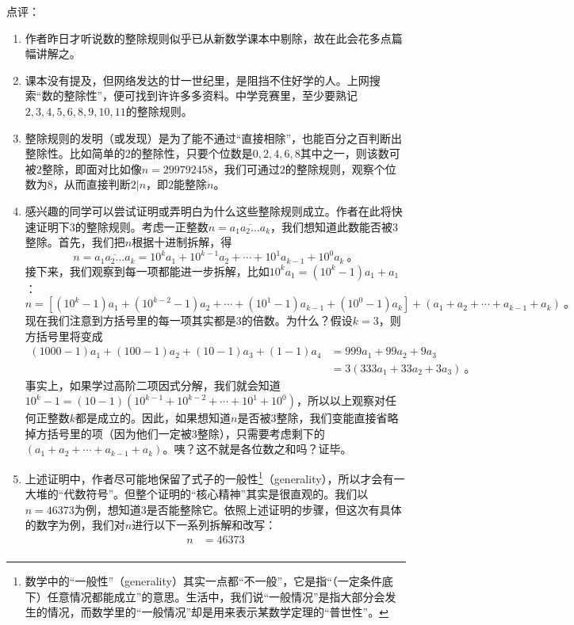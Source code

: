 \documentclass[a4,12pt]{article}
\begin{document}
	\noindent 点评：
	\begin{enumerate}[label=(\alph*)]
		\item 作者昨日才听说数的整除规则似乎已从新数学课本中剔除，故在此会花多点篇幅讲解之。
		\item 课本没有提及，但网络发达的廿一世纪里，是阻挡不住好学的人。上网搜索“数的整除性”，便可找到许许多多资料。中学竞赛里，至少要熟记$2, 3, 4, 5, 6, 8, 9, 10, 11$的整除规则。
		\item 整除规则的发明（或发现）是为了能不通过“直接相除”，也能百分之百判断出整除性。比如简单的$2$的整除性，只要个位数是$0, 2, 4, 6, 8$其中之一，则该数可被$2$整除，即面对比如像$n=299792458$，我们可通过$2$的整除规则，观察个位数为$8$，从而直接判断$2|n$，即$2$能整除$n$。
		\item 感兴趣的同学可以尝试证明或弄明白为什么这些整除规则成立。作者在此将快速证明下$3$的整除规则。考虑一正整数$n=\overline{a_1a_2\ldots a_k}$，我们想知道此数能否被$3$整除。首先，我们把$n$根据十进制拆解，得
			\[ n = \overline{a_1a_2\ldots a_k} = 10^ka_1 + 10^{k-1}a_2 + \cdots + 10^1a_{k-1} + 10^0a_k \ \mbox{。} \]
			接下来，我们观察到每一项都能进一步拆解，比如$10^ka_1 = (10^k-1)a_1 + a_1$：
			\[ n = [(10^k-1)a_1 + (10^{k-2}-1)a_2 + \cdots + (10^1-1)a_{k-1} + (10^0-1)a_k] + (a_1 + a_2 + \cdots + a_{k-1} + a_k) \ \mbox{。} \]
			现在我们注意到方括号里的每一项其实都是$3$的倍数。为什么？假设$k=3$，则方括号里将变成
			\[ \begin{aligned}
					(1000-1)a_1 + (100-1)a_2 + (10-1)a_3 + (1-1)a_4
					&= 999a_1 + 99a_2 + 9a_3 \\
					&= 3(333a_1 + 33a_2 + 3a_3) \ \mbox{。}
				\end{aligned}
			\]
			事实上，如果学过高阶二项因式分解，我们就会知道$10^k-1=(10-1)(10^{k-1} + 10^{k-2} + \cdots + 10^1 + 10^0)$，所以以上观察对任何正整数$k$都是成立的。因此，如果想知道$n$是否被$3$整除，我们变能直接省略掉方括号里的项（因为他们一定被$3$整除），只需要考虑剩下的$(a_1+a_2+\cdots+a_{k-1}+a_k)$。咦？这不就是各位数之和吗？证毕。
		\item 上述证明中，作者尽可能地保留了式子的一般性\footnote{数学中的“一般性”（generality）其实一点都“不一般”，它是指“（一定条件底下）任意情况都能成立”的意思。生活中，我们说“一般情况”是指大部分会发生的情况，而数学里的“一般情况”却是用来表示某数学定理的“普世性”。}（generality），所以才会有一大堆的“代数符号”。但整个证明的“核心精神”其实是很直观的。我们以$n=46373$为例，想知道$3$是否能整除它。依照上述证明的步骤，但这次有具体的数字为例，我们对$n$进行以下一系列拆解和改写：
			\[ \begin{aligned}
					n
					&= 46373 \\

\end{aligned}\]
\end{enumerate}
\end{document}
